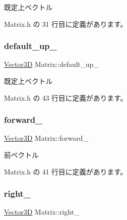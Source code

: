 既定上ベクトル 



 Matrix.\+h の 31 行目に定義があります。

\mbox{\label{class_matrix_ac48c2c66fab401482576b039d1260233}} 
\subsubsection{\texorpdfstring{default\+\_\+up\+\_\+}{default\_up\_}}
{\footnotesize\ttfamily \mbox{\hyperlink{class_vector3_d}{Vector3D}} Matrix\+::default\+\_\+up\+\_\+\hspace{0.3cm}{\ttfamily [private]}}



既定上ベクトル 



 Matrix.\+h の 43 行目に定義があります。

\mbox{\label{class_matrix_a2759a4a1b7542efd88f2c7c91886cdb7}} 
\subsubsection{\texorpdfstring{forward\+\_\+}{forward\_}}
{\footnotesize\ttfamily \mbox{\hyperlink{class_vector3_d}{Vector3D}} Matrix\+::forward\+\_\+\hspace{0.3cm}{\ttfamily [private]}}



前ベクトル 



 Matrix.\+h の 41 行目に定義があります。

\mbox{\label{class_matrix_a49474d6852e69b73066efa3c0bf648ac}} 
\subsubsection{\texorpdfstring{right\+\_\+}{right\_}}
{\footnotesize\ttfamily \mbox{\hyperlink{class_vector3_d}{Vector3D}} Matrix\+::right\+\_\+\hspace{0.3cm}{\ttfamily [private]}}



